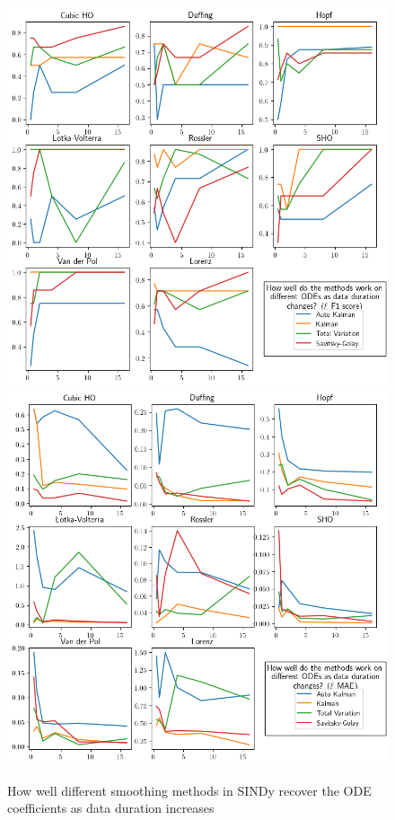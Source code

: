 \documentclass{ACCESS_latex_template_20231118/ieeeaccess}
\begin{document}
\begin{figure}
    \label{fig:time}
    \centering
    \includegraphics[width=.65\textwidth]{images/summary_f1_time.png}\\
    \includegraphics[width=.65\textwidth]{images/summary_mae_time.png}
    \caption{How well different smoothing methods in SINDy recover the ODE coefficients as data duration increases}
\end{figure}
\end{document}
